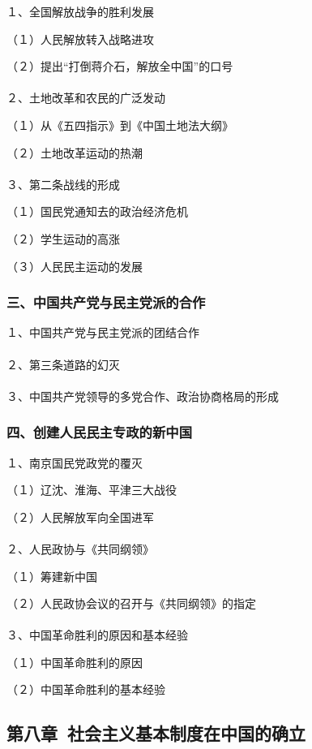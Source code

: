 \documentclass{ctexart}
\begin{document}
１、全国解放战争的胜利发展　

（１）人民解放转入战略进攻

（２）提出“打倒蒋介石，解放全中国”的口号
\\\\

２、土地改革和农民的广泛发动

（１）从《五四指示》到《中国土地法大纲》

（２）土地改革运动的热潮
\\\\

３、第二条战线的形成

（１）国民党通知去的政治经济危机

（２）学生运动的高涨

（３）人民民主运动的发展

\subsubsection{三、中国共产党与民主党派的合作}
１、中国共产党与民主党派的团结合作
\\\\

２、第三条道路的幻灭
\\\\

３、中国共产党领导的多党合作、政治协商格局的形成

\subsubsection{四、创建人民民主专政的新中国}

１、南京国民党政党的覆灭

（１）辽沈、淮海、平津三大战役

（２）人民解放军向全国进军
\\\\

２、人民政协与《共同纲领》

（１）筹建新中国

（２）人民政协会议的召开与《共同纲领》的指定
\\\\

３、中国革命胜利的原因和基本经验

（１）中国革命胜利的原因

（２）中国革命胜利的基本经验



\subsection{第八章\ 社会主义基本制度在中国的确立}
\end{document}
